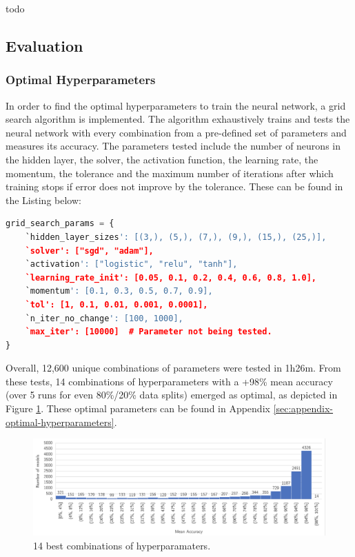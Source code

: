 \documentclass[letterpaper,12pt]{article}
\begin{document}
todo



\subsection{Evaluation}
\label{sec:evaluation}

\subsubsection{Optimal Hyperparameters}
\label{sec:optimal-hyperparams}

In order to find the optimal hyperparameters to train the neural network, a grid search algorithm is implemented. The algorithm exhaustively trains and tests the neural network with every combination from a pre-defined set of parameters and measures its accuracy. The parameters tested include the number of neurons in the hidden layer, the solver, the activation function, the learning rate, the momentum, the tolerance and the maximum number of iterations after which training stops if error does not improve by the tolerance. These can be found in the Listing below:

\begin{lstlisting}[language=Python]
grid_search_params = {
    `hidden_layer_sizes': [(3,), (5,), (7,), (9,), (15,), (25,)],
    `solver': ["sgd", "adam"],
    `activation': ["logistic", "relu", "tanh"],
    `learning_rate_init': [0.05, 0.1, 0.2, 0.4, 0.6, 0.8, 1.0],
    `momentum': [0.1, 0.3, 0.5, 0.7, 0.9],
    `tol': [1, 0.1, 0.01, 0.001, 0.0001],
    `n_iter_no_change': [100, 1000],
    `max_iter': [10000]  # Parameter not being tested.
}
\end{lstlisting}

Overall, 12,600 unique combinations of parameters were tested in 1h26m. From these tests, 14 combinations of hyperparameters with a +98\% mean accuracy (over 5 runs for even 80\%/20\% data splits) emerged as optimal, as depicted in Figure \ref{fig:gridsearch_results}. These optimal parameters can be found in Appendix \ref{sec:appendix-optimal-hyperparameters}.

\begin{figure}[h] 
\centerline{\includegraphics[width=\textwidth]{report/figures/gridsearch_results.png}}
\caption{\label{fig:gridsearch_results}14 best combinations of hyperparamaters.}
\end{figure}
\end{document}
